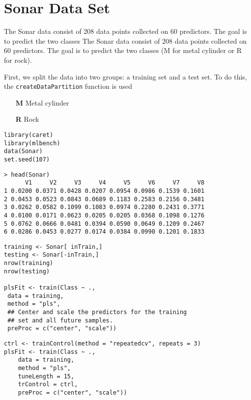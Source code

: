 \documentclass[caret-main.tex]{subfiles}
\begin{document}
\section{Sonar Data Set}
The Sonar data consist of 208 data points collected on 60 predictors. 
The goal is to predict the two classes
The Sonar data consist of 208 data points collected on 60 predictors. 
The goal is to predict the two classes (M for metal cylinder or R for rock).

First, we split the data into two groups: a training set and a test set. To do this, the \texttt{createDataPartition} function is used

\begin{itemize}
\item[\textbf{M}] Metal cylinder 
\item[\textbf{R}] Rock
\end{itemize}

\begin{framed}
\begin{verbatim}
library(caret)
library(mlbench)
data(Sonar)
set.seed(107)
\end{verbatim}
\end{framed}

\begin{verbatim}
> head(Sonar)
      V1     V2     V3     V4     V5     V6     V7     V8
1 0.0200 0.0371 0.0428 0.0207 0.0954 0.0986 0.1539 0.1601
2 0.0453 0.0523 0.0843 0.0689 0.1183 0.2583 0.2156 0.3481
3 0.0262 0.0582 0.1099 0.1083 0.0974 0.2280 0.2431 0.3771
4 0.0100 0.0171 0.0623 0.0205 0.0205 0.0368 0.1098 0.1276
5 0.0762 0.0666 0.0481 0.0394 0.0590 0.0649 0.1209 0.2467
6 0.0286 0.0453 0.0277 0.0174 0.0384 0.0990 0.1201 0.1833
\end{verbatim}

\begin{framed}
\begin{verbatim}
training <- Sonar[ inTrain,]
testing <- Sonar[-inTrain,]
nrow(training)
nrow(testing)

plsFit <- train(Class ~ .,
 data = training,
 method = "pls",
 ## Center and scale the predictors for the training
 ## set and all future samples.
 preProc = c("center", "scale"))

\end{verbatim}
\end{framed}
\newpage
\begin{framed}
\begin{verbatim}
ctrl <- trainControl(method = "repeatedcv", repeats = 3)
plsFit <- train(Class ~ .,
	data = training,
	method = "pls",
	tuneLength = 15,
	trControl = ctrl,
	preProc = c("center", "scale"))
\end{verbatim}
\end{framed}
\end{document}
